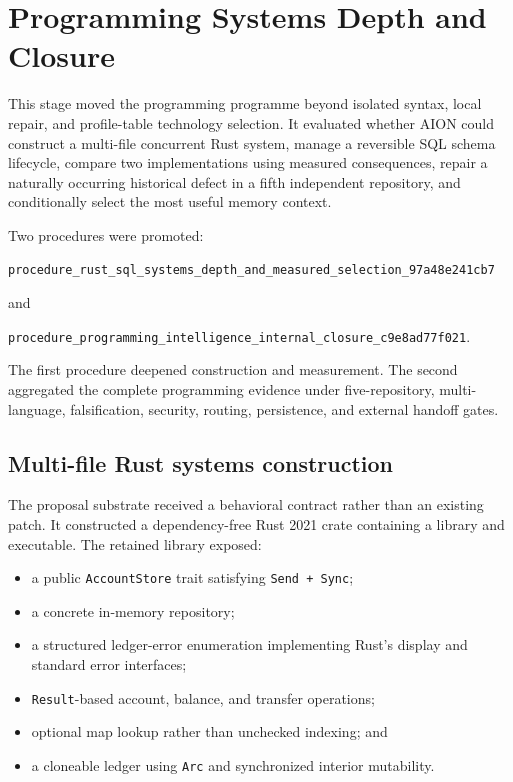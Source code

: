 
\section{Programming Systems Depth and Closure}
\label{sec:programming-internal-closure}

This stage moved the programming programme beyond isolated syntax, local
repair, and profile-table technology selection.  It evaluated whether AION
could construct a multi-file concurrent Rust system, manage a reversible SQL
schema lifecycle, compare two implementations using measured consequences,
repair a naturally occurring historical defect in a fifth independent
repository, and conditionally select the most useful memory context.

Two procedures were promoted:
\begin{center}
{\footnotesize\texttt{procedure\_rust\_sql\_systems\_depth\_and\_measured\_selection\_97a48e241cb7}}
\end{center}
and
\begin{center}
{\footnotesize\texttt{procedure\_programming\_intelligence\_internal\_closure\_c9e8ad77f021}}.
\end{center}

The first procedure deepened construction and measurement.  The second
aggregated the complete programming evidence under five-repository,
multi-language, falsification, security, routing, persistence, and external
handoff gates.


\subsection{Multi-file Rust systems construction}
\label{subsec:rust-systems-depth}

The proposal substrate received a behavioral contract rather than an existing
patch.  It constructed a dependency-free Rust 2021 crate containing a library
and executable.  The retained library exposed:
\begin{itemize}
  \item a public \texttt{AccountStore} trait satisfying \texttt{Send + Sync};
  \item a concrete in-memory repository;
  \item a structured ledger-error enumeration implementing Rust's display and
        standard error interfaces;
  \item \texttt{Result}-based account, balance, and transfer operations;
  \item optional map lookup rather than unchecked indexing; and
  \item a cloneable ledger using \texttt{Arc} and synchronized interior
        mutability.
\end{itemize}

